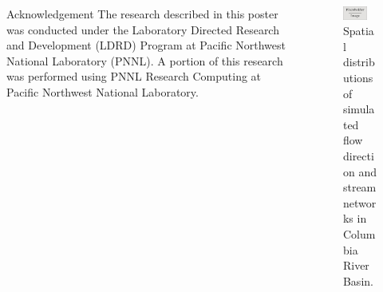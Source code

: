 \documentclass[final]{beamer}
\newlength{\sepwid}
\newlength{\onecolwid}
\newlength{\threecolwid}
\begin{document}
\begin{frame}[t]
\begin{columns}[t]
\begin{column}{\onecolwid}
      \begin{alertblock}{Acknowledgement}
        The research described in this poster was conducted under the Laboratory Directed Research and Development (LDRD) Program at Pacific Northwest National Laboratory (PNNL). A portion of this research was performed using PNNL Research Computing at Pacific Northwest National Laboratory.
      \end{alertblock}
    \end{column} %
    \begin{column}{\threecolwid}
      \vspace{3in}
      \begin{figure}
        \includegraphics[width = 0.72\textwidth]{figure/placeholder.jpg}
        \caption{Spatial distributions of simulated flow direction and stream networks in Columbia River Basin.}
        \label{fig:cbc}
      \end{figure}
    \end{column} %
  \end{columns} %
  \vspace{-1.5in}
  \begin{columns}[t]
    \begin{column}{\sepwid}
    \end{column} %

\end{columns}
\end{frame}
\end{document}
